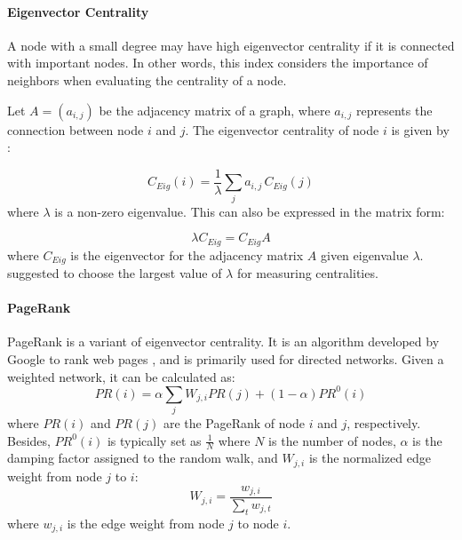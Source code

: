 \paragraph{Eigenvector Centrality}

A node with a small degree may have high eigenvector centrality \citep{bonacich1972factoring} if it is connected with important nodes. In other words, this index considers the importance of neighbors when evaluating the centrality of a node.

Let $A = (a_{i,j})$ be the adjacency matrix of a graph, where $a_{i,j}$ represents the connection between node $i$ and $j$. The eigenvector centrality of node $i$ is given by \citep{bonacich2007some}:

\begin{equation}
C_{Eig}(i)= \frac{1}{\lambda} \sum_j a_{i,j} \, C_{Eig}(j)
\end{equation}
where $\lambda$ is a non-zero eigenvalue. This can also be expressed in the matrix form:

\begin{equation}
\lambda C_{Eig} = C_{Eig} A
\end{equation}
where $C_{Eig}$ is the eigenvector for the adjacency matrix $A$ given eigenvalue $\lambda$. \citet{bonacich1972factoring} suggested to choose the largest value of $\lambda$ for measuring centralities. %




\paragraph{PageRank}

PageRank is a variant of eigenvector centrality. It is an algorithm developed by Google to rank web pages \citep{page1999pagerank}, and is primarily used for directed networks. Given a weighted network, it can be calculated as:
\begin{equation}
PR(i)= \alpha \sum_j W_{j,i}PR(j) + (1-\alpha)PR^0(i)
\end{equation}
where $PR(i)$ and $PR(j)$ are the PageRank of node $i$ and $j$, respectively. Besides, $PR^0(i)$ is typically set as $\frac{1}{N}$ where $N$ is the number of nodes, $\alpha$ is the damping factor assigned to the random walk, and $W_{j,i}$ is the normalized edge weight from node $j$ to $i$:
\begin{equation}
W_{j,i} = \frac{w_{j,i}}{\sum_t w_{j,t}}
\end{equation}
where $w_{j,i}$ is the edge weight from node $j$ to node $i$. 





